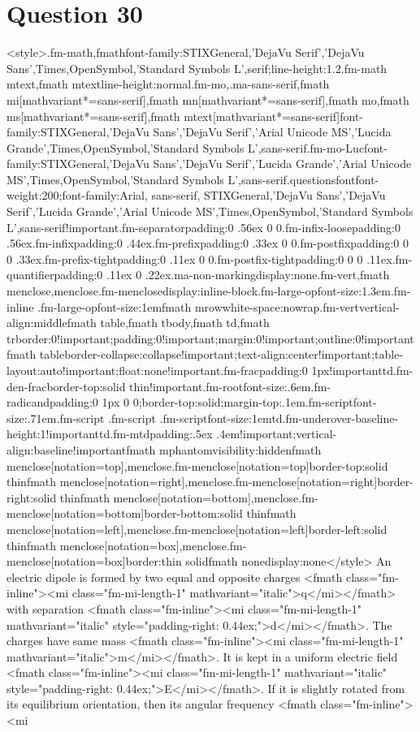 \documentclass{article}
\begin{document}
\section*{Question 30}
<style>.fm-math,fmath{font-family:STIXGeneral,'DejaVu Serif','DejaVu Sans',Times,OpenSymbol,'Standard Symbols L',serif;line-height:1.2}.fm-math mtext,fmath mtext{line-height:normal}.fm-mo,.ma-sans-serif,fmath mi[mathvariant*=sans-serif],fmath mn[mathvariant*=sans-serif],fmath mo,fmath ms[mathvariant*=sans-serif],fmath mtext[mathvariant*=sans-serif]{font-family:STIXGeneral,'DejaVu Sans','DejaVu Serif','Arial Unicode MS','Lucida Grande',Times,OpenSymbol,'Standard Symbols L',sans-serif}.fm-mo-Luc{font-family:STIXGeneral,'DejaVu Sans','DejaVu Serif','Lucida Grande','Arial Unicode MS',Times,OpenSymbol,'Standard Symbols L',sans-serif}.questionsfont{font-weight:200;font-family:Arial, sans-serif, STIXGeneral,'DejaVu Sans','DejaVu Serif','Lucida Grande','Arial Unicode MS',Times,OpenSymbol,'Standard Symbols L',sans-serif!important}.fm-separator{padding:0 .56ex 0 0}.fm-infix-loose{padding:0 .56ex}.fm-infix{padding:0 .44ex}.fm-prefix{padding:0 .33ex 0 0}.fm-postfix{padding:0 0 0 .33ex}.fm-prefix-tight{padding:0 .11ex 0 0}.fm-postfix-tight{padding:0 0 0 .11ex}.fm-quantifier{padding:0 .11ex 0 .22ex}.ma-non-marking{display:none}.fm-vert,fmath menclose,menclose.fm-menclose{display:inline-block}.fm-large-op{font-size:1.3em}.fm-inline .fm-large-op{font-size:1em}fmath mrow{white-space:nowrap}.fm-vert{vertical-align:middle}fmath table,fmath tbody,fmath td,fmath tr{border:0!important;padding:0!important;margin:0!important;outline:0!important}fmath table{border-collapse:collapse!important;text-align:center!important;table-layout:auto!important;float:none!important}.fm-frac{padding:0 1px!important}td.fm-den-frac{border-top:solid thin!important}.fm-root{font-size:.6em}.fm-radicand{padding:0 1px 0 0;border-top:solid;margin-top:.1em}.fm-script{font-size:.71em}.fm-script .fm-script .fm-script{font-size:1em}td.fm-underover-base{line-height:1!important}td.fm-mtd{padding:.5ex .4em!important;vertical-align:baseline!important}fmath mphantom{visibility:hidden}fmath menclose[notation=top],menclose.fm-menclose[notation=top]{border-top:solid thin}fmath menclose[notation=right],menclose.fm-menclose[notation=right]{border-right:solid thin}fmath menclose[notation=bottom],menclose.fm-menclose[notation=bottom]{border-bottom:solid thin}fmath menclose[notation=left],menclose.fm-menclose[notation=left]{border-left:solid thin}fmath menclose[notation=box],menclose.fm-menclose[notation=box]{border:thin solid}fmath none{display:none}</style> An electric dipole is formed by two equal and opposite charges <fmath class="fm-inline"><mi class="fm-mi-length-1" mathvariant="italic">q</mi></fmath> with separation <fmath class="fm-inline"><mi class="fm-mi-length-1" mathvariant="italic" style="padding-right: 0.44ex;">d</mi></fmath>. The charges have same mass <fmath class="fm-inline"><mi class="fm-mi-length-1" mathvariant="italic">m</mi></fmath>. It is kept in a uniform electric field <fmath class="fm-inline"><mi class="fm-mi-length-1" mathvariant="italic" style="padding-right: 0.44ex;">E</mi></fmath>. If it is slightly rotated from its equilibrium orientation, then its angular frequency <fmath class="fm-inline"><mi 
\end{document}
